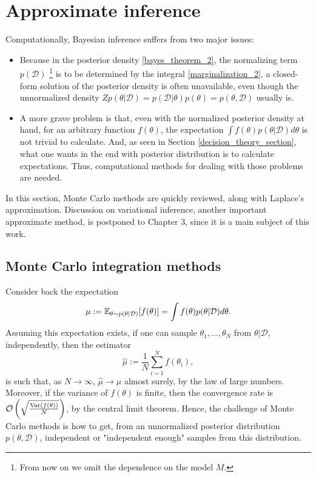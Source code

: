 \section{Approximate inference}
Computationally, Bayesian inference suffers from two major issues: 
\begin{itemize}
\item Because in the posterior density \eqref{bayes_theorem_2}, the normalizing term $p(\mathcal{D})$ \footnote{From now on we omit the dependence on the model $M$.} is to be determined by the integral \eqref{marginalization_2}, a closed-form solution of the posterior density is often unavailable, even though the unnormalized density $Z p(\theta|\mathcal{D}) = p(\mathcal{D}|\theta)p(\theta) = p(\theta,\mathcal{D})$ usually is. 

\item A more grave problem is that, even with the normalized posterior density at hand, for an arbitrary function $f(\theta)$, the expectation $\int f(\theta) p(\theta|\mathcal{D}) d\theta$ is not trivial to calculate. And, as seen in Section \ref{decision_theory_section}, what one wants in the end with posterior distribution is to calculate expectations. Thus, computational methods for dealing with those problems are needed. 
\end{itemize}

In this section, Monte Carlo methods are quickly reviewed, along with Laplace's approximation. Discussion on variational inference, another important approximate method, is postponed to Chapter 3, since it is a main subject of this work.

\subsection{Monte Carlo integration methods}

Consider back the expectation 
\begin{equation}\label{ev_example}
\mu := {\mathbb E}_{\theta \sim p(\theta|\mathcal{D})}[f(\theta)] = \int f(\theta) p(\theta|\mathcal{D}) d\theta.
\end{equation}
Assuming this expectation exists, if one can sample $\theta_1,\ldots,\theta_N$ from $\theta|\mathcal{D}$, independently, then the estimator 
\begin{equation}
 \hat{\mu} := \frac{1}{N} \sum_{i=1}^N f(\theta_i),
\end{equation}
is such that, as $N \to \infty$, $\hat{\mu} \to \mu$ almost surely, by the law of large numbers. Moreover, if the variance of $f(\theta)$ is finite, then the convergence rate is $
\mathcal{O}\left(\sqrt{\frac{\mathrm{Var}(f(\theta))}{N}}\right)$,
by the central limit theorem. Hence, the challenge of Monte Carlo methods is how to get, from an unnormalized posterior distribution $p(\theta,\mathcal{D})$, independent or "independent enough" samples from this distribution.

